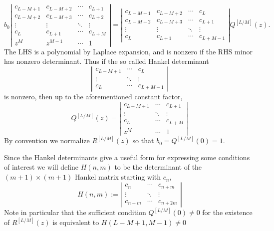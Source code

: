 \[
  b_0
  \left|
  \begin{matrix}
    c_{L-M+1} & c_{L-M+2} & \cdots & c_{L+1} \\
    c_{L-M+2} & c_{L-M+3} & \cdots & c_{L+2} \\
    \vdots & \vdots & \ddots & \vdots \\
    c_{L} & c_{L+1} & \cdots & c_{L+M} \\
    z^M & z^{M-1} & \cdots & 1
  \end{matrix}
  \right|
  =
  \left|
  \begin{matrix}
    c_{L-M+1} & c_{L-M+2} & \cdots & c_L \\
    c_{L-M+2} & c_{L-M+3} & \cdots & c_{L+1} \\
    \vdots & \vdots & \ddots & \vdots  \\
    c_L & c_{L+1} & \cdots & c_{L+M-1} 
  \end{matrix}
  \right| 
  Q^{[L/M]}(z).
\]
The LHS is a polynomial by Laplace expansion, and is nonzero if the RHS minor has nonzero determinant. Thus if the so called Hankel determinant
\[
  \left|
  \begin{matrix}
    c_{L-M+1} & \cdots & c_L \\
    \vdots & \ddots & \vdots  \\
    c_L & \cdots & c_{L+M-1} 
  \end{matrix}
  \right| 
\]
is nonzero, then up to the aforementioned constant factor,
\begin{equation}
  Q^{[L/M]}(z) = 
  \left|
  \begin{matrix}
    c_{L-M+1} & \cdots & c_{L+1} \\
    \vdots & \ddots & \vdots \\
    c_{L} & \cdots & c_{L+M} \\
    z^M & \cdots & 1
  \end{matrix}
  \right| 
  \label{eq:Qdet}
\end{equation}
By convention we normalize $R^{[L/M]}(z)$ so that $b_0 = Q^{[L/M]}(0) = 1$. 

Since the Hankel determinants give a useful form for expressing some conditions of interest we will define $H(n,m)$ to be the determinant of the $(m + 1) \times (m + 1)$ Hankel matrix starting with $c_n$,
\[
  H(n,m) :=
  \left|
  \begin{matrix}
    c_{n} & \cdots & c_{n+m} \\
    \vdots & \ddots & \vdots  \\
    c_{n+m} & \cdots & c_{n+2m} 
  \end{matrix}
  \right|
\]
Note in particular that the sufficient condition $Q^{[L/M]}(0) \neq 0$ for the existence of $R^{[L/M]}(z)$ is equivalent to $H(L-M+1, M-1) \neq 0$



